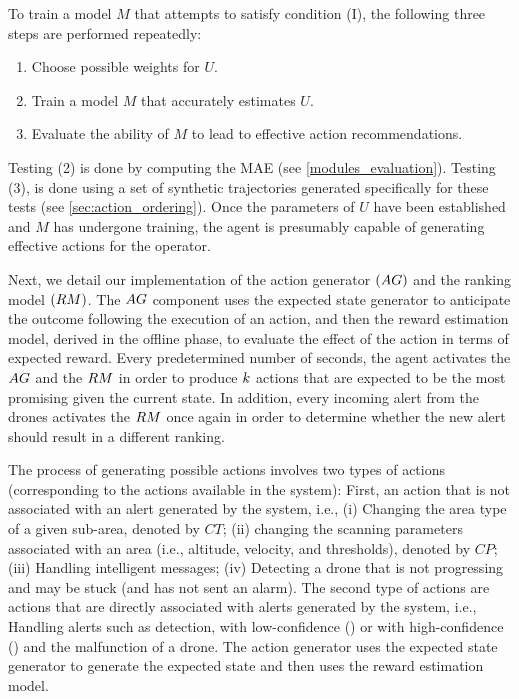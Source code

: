 To train a  model $M$ that attempts to satisfy condition  (I), the following three steps are performed  repeatedly:
\begin{enumerate}[nosep]
    \item Choose possible weights for $U$.
    \item Train a model $M$ that accurately estimates $U$.
    \item Evaluate the ability of $M$ to lead to effective action recommendations.
\end{enumerate}
Testing (2) is done by computing the MAE  (see \ref{modules_evaluation}). 
Testing (3), is done using a set of synthetic trajectories generated specifically for these tests (see \ref{sec:action_ordering}).
Once the parameters of $U$ have been established and $M$ has undergone training, the agent is presumably capable of generating effective actions for the operator.



Next, we detail our implementation of the action generator $(AG)$ and the ranking model $(RM)$.
The $AG$ component uses the expected state generator to anticipate the outcome following the execution of an action, and then the reward estimation model, derived in the offline phase, to evaluate the effect of the action in terms of expected reward.
Every predetermined number of seconds, the agent activates the $AG$ and the $RM$ in order to produce $k$ actions that are expected to be the most promising given the current state. In addition, every incoming alert from the drones activates the $RM$ once again in order to determine whether the new alert should result in a different ranking. 

The process of generating possible actions involves two types of actions (corresponding to the actions available in the system): First, an action that is not associated with an alert generated by the system, i.e.,
(i) Changing the area type of a given sub-area, denoted by $CT$; (ii) changing the scanning parameters associated with an area (i.e., altitude, velocity, and thresholds), denoted by $CP$; (iii) Handling intelligent messages;  (iv) Detecting a drone that is not progressing and may be stuck (and has not sent an alarm).
The second type of actions are actions that are directly associated with alerts generated by the system, i.e., Handling alerts such as detection, with low-confidence (\pausetreshold) or with high-confidence (\detectiothreshold) and the malfunction of a drone. The action generator uses the expected state generator to generate the expected state and then uses the reward estimation model. 

